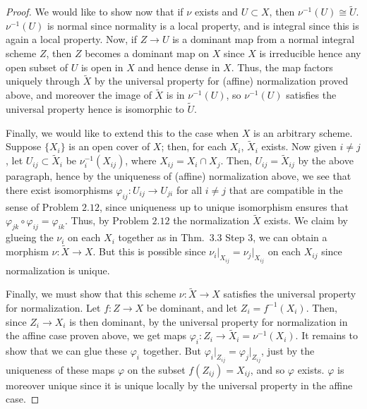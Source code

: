 \documentclass[12pt,letterpaper]{article}
\theoremstyle{definition}
\theoremstyle{remark}
\numberwithin{equation}{section}
\numberwithin{figure}{problem}
\begin{document}
\begin{proof}
  \par We would like to show now that if $\nu$ exists and $U \subset X$, then $\nu^{-1}(U) \cong \tilde{U}$. $\nu^{-1}(U)$ is normal since normality is a local property, and is integral since this is again a local property. Now, if $Z \to U$ is a dominant map from a normal integral scheme $Z$, then $Z$ becomes a dominant map on $X$ since $X$ is irreducible hence any open subset of $U$ is open in $X$ and hence dense in $X$. Thus, the map factors uniquely through $\tilde{X}$ by the universal property for (affine) normalization proved above, and moreover the image of $\tilde{X}$ is in $\nu^{-1}(U)$, so $\nu^{-1}(U)$ satisfies the universal property hence is isomorphic to $\tilde{U}$.
  \par Finally, we would like to extend this to the case when $X$ is an arbitrary scheme. Suppose $\{X_i\}$ is an open cover of $X$; then, for each $X_i$, $\tilde{X}_i$ exists. Now given $i \ne j$, let $U_{ij} \subset \tilde{X}_i$ be $\nu_i^{-1}(X_{ij})$, where $X_{ij} = X_i \cap X_j$. Then, $U_{ij} = \tilde{X}_{ij}$ by the above paragraph, hence by the uniqueness of (affine) normalization above, we see that there exist isomorphisms $\varphi_{ij}\colon U_{ij} \to U_{ji}$ for all $i \ne j$ that are compatible in the sense of Problem $2.12$, since uniqueness up to unique isomorphism ensures that $\varphi_{jk} \circ \varphi_{ij} = \varphi_{ik}$. Thus, by Problem $2.12$ the normalization $\tilde{X}$ exists. We claim by glueing the $\nu_i$ on each $X_i$ together as in Thm.~3.3 Step 3, we can obtain a morphism $\nu\colon \tilde{X} \to X$. But this is possible since $\nu_i\vert_{X_{ij}} = \nu_j\vert_{X_{ij}}$ on each $X_{ij}$ since normalization is unique.
  \par Finally, we must show that this scheme $\nu\colon\tilde{X} \to X$ satisfies the universal property for normalization. Let $f \colon Z \to X$ be dominant, and let $Z_i = f^{-1}(X_i)$. Then, since $Z_i \to X_i$ is then dominant, by the universal property for normalization in the affine case proven above, we get maps $\varphi_i\colon Z_i \to \tilde{X}_i = \nu^{-1}(X_i)$. It remains to show that we can glue these $\varphi_i$ together. But $\varphi_i\vert_{Z_{ij}} = \varphi_j\vert_{Z_{ij}}$, just by the uniqueness of these maps $\varphi$ on the subset $f(Z_{ij}) = X_{ij}$, and so $\varphi$ exists. $\varphi$ is moreover unique since it is unique locally by the universal property in the affine case.
\end{proof}
\end{document}
